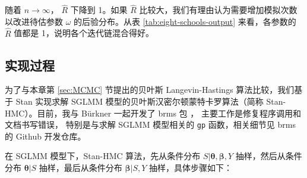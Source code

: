 \documentclass[12pt,a4paper,UTF8,twoside]{book}
\theoremstyle{definition}
\theoremstyle{definition}
\theoremstyle{definition}
\theoremstyle{remark}
\begin{document}
\noindent 随着 \(n \to \infty\)， \(\hat{R}\) 下降到 1。如果 \(\hat{R}\) 比较大，我们有理由认为需要增加模拟次数以改进待估参数 \(\omega\) 的后验分布。从表 \ref{tab:eight-schools-output} 来看，各参数的 \(\hat{R}\) 值都是 1，说明各个迭代链混合得好。

\hypertarget{subsec:stan-hmc}{%
\subsection{实现过程}\label{subsec:stan-hmc}}

为了与本章第 \ref{sec:MCMC} 节提出的贝叶斯 Langevin-Hastings 算法比较，我们基于 Stan 实现求解 SGLMM 模型的贝叶斯汉密尔顿蒙特卡罗算法（简称 Stan-HMC）。目前，我与 Bürkner 一起开发了 brms 包 \citep{brms2017JSS}， 主要工作是修复程序调用和文档书写错误， 特别是与求解 SGLMM 模型相关的 \texttt{gp} 函数，相关细节见 brms 的 Github 开发仓库。

在 SGLMM 模型下，Stan-HMC 算法，先从条件分布 \(S|\boldsymbol{\theta},\boldsymbol{\beta},Y\) 抽样，然后从条件分布 \(\boldsymbol{\theta}|S\) 抽样，最后从条件分布 \(\boldsymbol{\beta}|S,Y\) 抽样，具体步骤如下：
\end{document}
